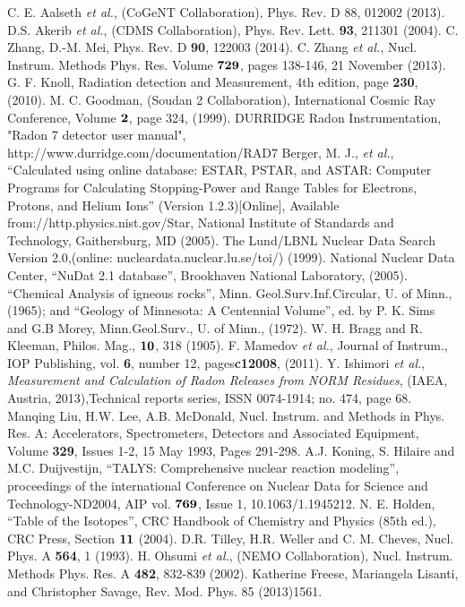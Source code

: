 \documentclass[aps,prc,showpacs,twocolumn,superscriptaddress]{revtex4-1}
\begin{document}
\begin{thebibliography}{99}
 C. E. Aalseth {\it{et al.}}, (CoGeNT Collaboration), Phys. Rev. D 88, 012002 (2013).
 D.S. Akerib {\it{et al.}}, (CDMS Collaboration), Phys. Rev. Lett. {\bf{93}}, 211301 (2004).
 C. Zhang, D.-M. Mei, Phys. Rev. D {\bf{90}}, 122003 (2014).
 C. Zhang {\it{et al.}}, Nucl. Instrum. Methods Phys. Res. Volume $\bf{729}$, pages 138-146, 21 November (2013).
 G. F. Knoll, Radiation detection and Measurement, 4th edition, page {\bf{230}}, (2010).
 M. C. Goodman, (Soudan 2 Collaboration), International Cosmic Ray Conference, Volume $\bf{2}$, page 324, (1999).
 DURRIDGE  Radon Instrumentation, "Radon 7 detector user manual", http://www.durridge.com/documentation/RAD7%
 Berger, M. J., {\it{et al.}}, \enquote{Calculated using online database: ESTAR, PSTAR, and ASTAR: Computer Programs for Calculating Stopping-Power and Range Tables for Electrons, Protons, and Helium Ions} (Version 1.2.3)[Online], Available from://http.physics.nist.gov/Star, National Institute of Standards and Technology, Gaithersburg, MD (2005).
 The Lund/LBNL Nuclear Data Search Version 2.0,(online: nucleardata.nuclear.lu.se/toi/) (1999).
 National Nuclear Data Center, \enquote{NuDat 2.1 database}, Brookhaven National Laboratory, (2005).
 \enquote{Chemical Analysis of igneous rocks}, Minn. Geol.Surv.Inf.Circular, U. of Minn., (1965); and \enquote{Geology of Minnesota: A Centennial Volume}, ed. by P. K. Sims and G.B Morey, Minn.Geol.Surv., U. of Minn., (1972).
 W. H. Bragg and R. Kleeman, Philos. Mag., $\bf{10}$, 318 (1905).
 F. Mamedov {\it{et al.}}, Journal of Instrum., IOP Publishing, vol. {\bf{6}}, number 12, pages{\bf{c12008}}, (2011).
 Y. Ishimori {\it{et al.}}, {\it{Measurement and Calculation of Radon Releases from NORM Residues}}, (IAEA, Austria, 2013),Technical reports series, ISSN 0074-1914; no. 474, page 68.
 Manqing Liu, H.W. Lee, A.B. McDonald, Nucl. Instrum. and Methods in Phys. Res. A: Accelerators, Spectrometers, Detectors and Associated Equipment, Volume {\bf{329}}, Issues 1-2, 15 May 1993, Pages 291-298.
 A.J. Koning, S. Hilaire and M.C. Duijvestijn, \enquote{TALYS: Comprehensive nuclear reaction modeling}, proceedings of the international Conference on Nuclear Data for Science and Technology-ND2004, AIP vol. $\bf{769}$, Issue 1, 10.1063/1.1945212.
 N. E. Holden, \enquote{Table of the Isotopes}, CRC Handbook of Chemistry and Physics (85th ed.), CRC Press, Section $\bf{11}$ (2004).
 D.R. Tilley, H.R. Weller and C. M. Cheves, Nucl. Phys. A {\bf{564}}, 1 (1993).
 H. Ohsumi {\it{et al.}}, (NEMO Collaboration), Nucl. Instrum. Methods Phys. Res. A {\bf{482}}, 832-839 (2002).
 Katherine Freese, Mariangela Lisanti, and Christopher Savage, Rev. Mod. Phys. 85 (2013)1561.

\end{thebibliography}
\end{document}
